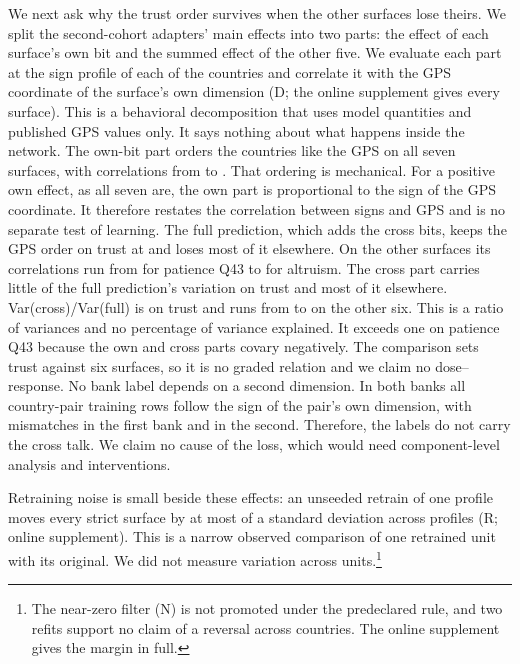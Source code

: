 We next ask why the trust order survives when the other surfaces lose theirs. We split the second-cohort adapters' main effects into two parts: the effect of each surface's own bit and the summed effect of the other five. We evaluate each part at the sign profile of each of the  countries and correlate it with the GPS coordinate of the surface's own dimension (D; the online supplement gives every surface). This is a behavioral decomposition that uses model quantities and published GPS values only. It says nothing about what happens inside the network. The own-bit part orders the countries like the GPS on all seven surfaces, with correlations from  to . That ordering is mechanical. For a positive own effect, as all seven are, the own part is proportional to the sign of the GPS coordinate. It therefore restates the correlation between signs and GPS and is no separate test of learning. The full prediction, which adds the cross bits, keeps the GPS order on trust at  and loses most of it elsewhere. On the other surfaces its correlations run from  for patience Q43 to  for altruism. The cross part carries little of the full prediction's variation on trust and most of it elsewhere. Var(cross)/Var(full) is  on trust and runs from  to  on the other six. This is a ratio of variances and no percentage of variance explained. It exceeds one on patience Q43 because the own and cross parts covary negatively. The comparison sets trust against six surfaces, so it is no graded relation and we claim no dose--response. No bank label depends on a second dimension. In both banks all  country-pair training rows follow the sign of the pair's own dimension, with  mismatches in the first bank and  in the second. Therefore, the labels do not carry the cross talk. We claim no cause of the loss, which would need component-level analysis and interventions.

Retraining noise is small beside these effects: an unseeded retrain of one profile moves every strict surface by at most  of a standard deviation across profiles (R; online supplement). This is a narrow observed comparison of one retrained unit with its original. We did not measure variation across units.\footnote{The near-zero filter (N) is not promoted under the predeclared rule, and two refits support no claim of a reversal across countries. The online supplement gives the margin in full.}

